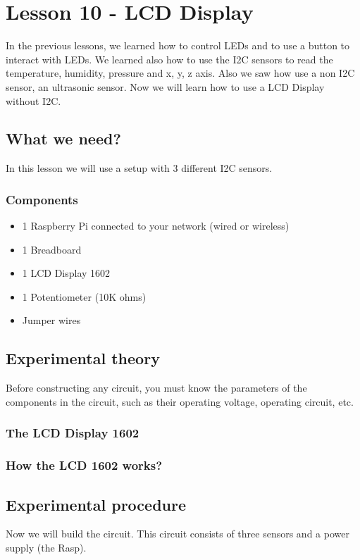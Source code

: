 \documentclass[10pt,twoside,english]{_support/latex/sbabook/sbabook}
\begin{document}
\frontmatter
\pagestyle{plain}

\tableofcontents*
\clearpage\listoffigures

\mainmatter

\chapter{Lesson 10 - LCD Display}
In the previous lessons, we learned how to control LEDs and to use a button to interact with LEDs. We learned also how to use the I2C sensors to read the temperature, humidity, pressure and x, y, z axis. Also we saw how use a non I2C sensor, an ultrasonic sensor. Now we will learn how to use a LCD Display without I2C. 
\section{What we need?}
In this lesson we will use a setup with 3 different I2C sensors.
\subsection{Components}
\begin{itemize}
\item 1 Raspberry Pi connected to your network (wired or wireless)
\item 1 Breadboard
\item 1 LCD Display 1602 
\item 1 Potentiometer (10K ohms)
\item Jumper wires
\end{itemize}
\section{Experimental theory}
Before constructing any circuit, you must know the parameters of the components in the circuit, such as their operating voltage, operating circuit, etc.
\subsection{The LCD Display 1602}\subsection{How the LCD 1602 works?}\section{Experimental procedure}
Now we will build the circuit. This circuit consists of three sensors and a power supply (the Rasp).
\end{document}
